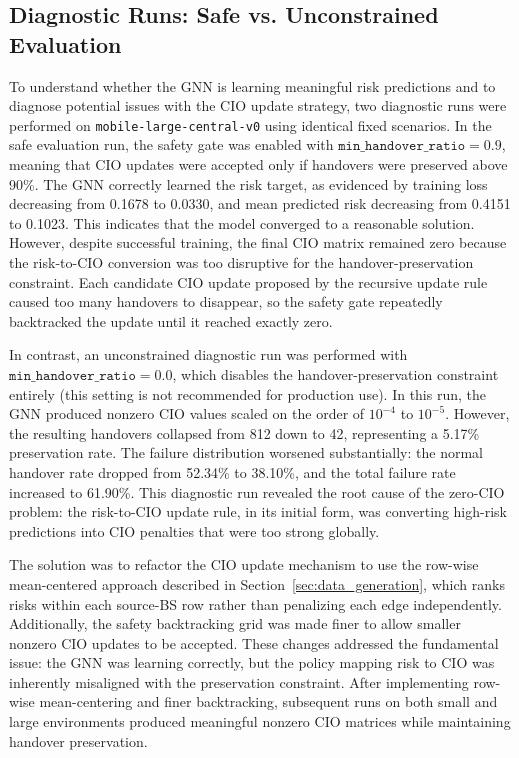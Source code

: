 \documentclass[11pt,a4paper]{article}
\begin{document}
\subsection{Diagnostic Runs: Safe vs. Unconstrained Evaluation}
To understand whether the GNN is learning meaningful risk predictions and to diagnose potential issues with the CIO update strategy, two diagnostic runs were performed on \texttt{mobile-large-central-v0} using identical fixed scenarios. In the safe evaluation run, the safety gate was enabled with $\texttt{min\_handover\_ratio} = 0.9$, meaning that CIO updates were accepted only if handovers were preserved above 90\%. The GNN correctly learned the risk target, as evidenced by training loss decreasing from 0.1678 to 0.0330, and mean predicted risk decreasing from 0.4151 to 0.1023. This indicates that the model converged to a reasonable solution. However, despite successful training, the final CIO matrix remained zero because the risk-to-CIO conversion was too disruptive for the handover-preservation constraint. Each candidate CIO update proposed by the recursive update rule caused too many handovers to disappear, so the safety gate repeatedly backtracked the update until it reached exactly zero.

In contrast, an unconstrained diagnostic run was performed with $\texttt{min\_handover\_ratio} = 0.0$, which disables the handover-preservation constraint entirely (this setting is not recommended for production use). In this run, the GNN produced nonzero CIO values scaled on the order of $10^{-4}$ to $10^{-5}$. However, the resulting handovers collapsed from 812 down to 42, representing a 5.17\% preservation rate. The failure distribution worsened substantially: the normal handover rate dropped from 52.34\% to 38.10\%, and the total failure rate increased to 61.90\%. This diagnostic run revealed the root cause of the zero-CIO problem: the risk-to-CIO update rule, in its initial form, was converting high-risk predictions into CIO penalties that were too strong globally.

The solution was to refactor the CIO update mechanism to use the row-wise mean-centered approach described in Section~\ref{sec:data_generation}, which ranks risks within each source-BS row rather than penalizing each edge independently. Additionally, the safety backtracking grid was made finer to allow smaller nonzero CIO updates to be accepted. These changes addressed the fundamental issue: the GNN was learning correctly, but the policy mapping risk to CIO was inherently misaligned with the preservation constraint. After implementing row-wise mean-centering and finer backtracking, subsequent runs on both small and large environments produced meaningful nonzero CIO matrices while maintaining handover preservation.
\end{document}
